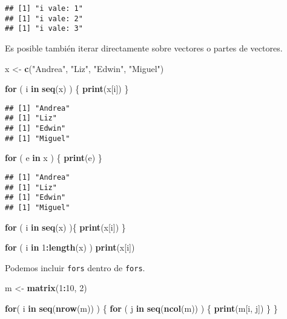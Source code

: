 \documentclass[]{article}
\newenvironment{Shaded}{\begin{snugshade}}{\end{snugshade}}
\newcommand{\KeywordTok}[1]{\textcolor[rgb]{0.13,0.29,0.53}{\textbf{#1}}}
\newcommand{\DecValTok}[1]{\textcolor[rgb]{0.00,0.00,0.81}{#1}}
\newcommand{\StringTok}[1]{\textcolor[rgb]{0.31,0.60,0.02}{#1}}
\newcommand{\ControlFlowTok}[1]{\textcolor[rgb]{0.13,0.29,0.53}{\textbf{#1}}}
\newcommand{\OperatorTok}[1]{\textcolor[rgb]{0.81,0.36,0.00}{\textbf{#1}}}
\newcommand{\NormalTok}[1]{#1}
\begin{document}
\begin{verbatim}
## [1] "i vale: 1"
## [1] "i vale: 2"
## [1] "i vale: 3"
\end{verbatim}

Es posible también iterar directamente sobre vectores o partes de
vectores.

\begin{Shaded}
\begin{Highlighting}[]
\NormalTok{x <-}\StringTok{ }\KeywordTok{c}\NormalTok{(}\StringTok{"Andrea"}\NormalTok{, }\StringTok{"Liz"}\NormalTok{, }\StringTok{"Edwin"}\NormalTok{, }\StringTok{"Miguel"}\NormalTok{)}

\ControlFlowTok{for}\NormalTok{ ( i }\ControlFlowTok{in} \KeywordTok{seq}\NormalTok{(x) ) \{}
  \KeywordTok{print}\NormalTok{(x[i])}
\NormalTok{\}}
\end{Highlighting}
\end{Shaded}

\begin{verbatim}
## [1] "Andrea"
## [1] "Liz"
## [1] "Edwin"
## [1] "Miguel"
\end{verbatim}

\begin{Shaded}
\begin{Highlighting}[]
\ControlFlowTok{for}\NormalTok{ ( e }\ControlFlowTok{in}\NormalTok{ x ) \{}
  \KeywordTok{print}\NormalTok{(e)}
\NormalTok{\}}
\end{Highlighting}
\end{Shaded}

\begin{verbatim}
## [1] "Andrea"
## [1] "Liz"
## [1] "Edwin"
## [1] "Miguel"
\end{verbatim}

\begin{Shaded}
\begin{Highlighting}[]
\ControlFlowTok{for}\NormalTok{ ( i }\ControlFlowTok{in} \KeywordTok{seq}\NormalTok{(x) )\{}
  \KeywordTok{print}\NormalTok{(x[i])}
\NormalTok{\}}

\ControlFlowTok{for}\NormalTok{ ( i }\ControlFlowTok{in} \DecValTok{1}\OperatorTok{:}\KeywordTok{length}\NormalTok{(x) ) }\KeywordTok{print}\NormalTok{(x[i])}
\end{Highlighting}
\end{Shaded}

Podemos incluir \texttt{fors} dentro de \texttt{fors}.

\begin{Shaded}
\begin{Highlighting}[]
\NormalTok{m <-}\StringTok{ }\KeywordTok{matrix}\NormalTok{(}\DecValTok{1}\OperatorTok{:}\DecValTok{10}\NormalTok{, }\DecValTok{2}\NormalTok{)}

\ControlFlowTok{for}\NormalTok{( i }\ControlFlowTok{in} \KeywordTok{seq}\NormalTok{(}\KeywordTok{nrow}\NormalTok{(m)) ) \{}
  \ControlFlowTok{for}\NormalTok{ ( j }\ControlFlowTok{in} \KeywordTok{seq}\NormalTok{(}\KeywordTok{ncol}\NormalTok{(m)) ) \{}
    \KeywordTok{print}\NormalTok{(m[i, j])}
\NormalTok{  \}}
\NormalTok{\}}
\end{Highlighting}
\end{Shaded}
\end{document}
